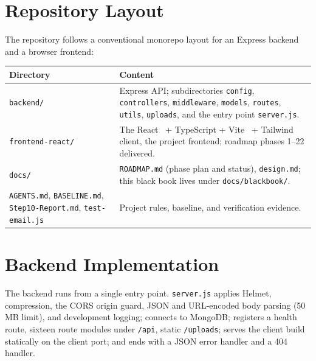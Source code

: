 
\section{Repository Layout}

The repository follows a conventional monorepo layout for an Express backend and
a browser frontend:

\begin{center}
\begin{tabular}{@{}p{4.6cm}p{10.0cm}@{}}
\toprule
\textbf{Directory} & \textbf{Content} \\
\midrule
\texttt{backend/} & Express API; subdirectories \texttt{config},
\texttt{controllers}, \texttt{middleware}, \texttt{models}, \texttt{routes},
\texttt{utils}, \texttt{uploads}, and the entry point \texttt{server.js}. \\
\texttt{frontend-react/} & The React~\cite{react} + TypeScript + Vite~\cite{vite} + Tailwind~\cite{tailwind} client,
the project frontend; roadmap phases 1--22 delivered. \\
\texttt{docs/} & \texttt{ROADMAP.md} (phase plan and
status), \texttt{design.md}; this black book lives under
\texttt{docs/blackbook/}. \\
\texttt{AGENTS.md}, \texttt{BASELINE.md}, \texttt{Step10-Report.md},
\texttt{test-email.js} & Project rules, baseline, and verification evidence. \\
\bottomrule
\end{tabular}
\end{center}

\section{Backend Implementation}

The backend runs from a single entry point. \texttt{server.js} applies Helmet,
compression, the CORS origin guard, JSON and URL-encoded body parsing (50\,MB
limit), and development logging; connects to MongoDB; registers a health route,
sixteen route modules under \texttt{/api}, static \texttt{/uploads}; serves
the client build statically on the client port; and ends with a JSON error handler and a
404 handler.

